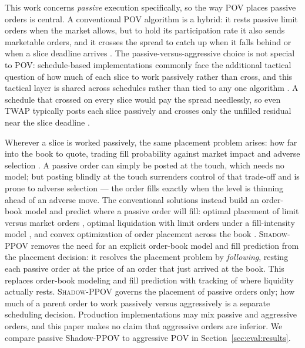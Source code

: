\documentclass[11pt]{article}
\newcommand{\pov}{\textsc{Shadow-PPOV}}
\begin{document}
This work concerns \emph{passive} execution specifically, so the way POV places
passive orders is central. A conventional POV algorithm is a hybrid: it rests
passive limit orders when the market allows, but to hold its participation rate
it also sends marketable orders, and it crosses the spread to catch up when it
falls behind or when a slice deadline arrives \cite{cartea2015,contkukanov2015}.
The passive-versus-aggressive choice is not special to POV: schedule-based
implementations commonly face the additional tactical question of how much of
each slice to work passively rather than
cross, and this tactical layer is shared across schedules rather than tied to any one algorithm \cite{scheduletactics2014,limitmarkettactics2014}. A schedule
that crossed on every slice would pay the spread needlessly, so even TWAP
typically posts each slice passively and crosses only the unfilled residual near
the slice deadline \cite{cesari2012}.

Wherever a slice is worked passively, the same placement problem arises: how far
into the book to quote, trading fill probability against market impact and
adverse selection \cite{glostenmilgrom1985,gueant2012,passiveimpact2026,negdrift2024}. A passive order can
simply be posted at the touch, which needs no model; but posting blindly at the
touch surrenders control of that trade-off and is prone to adverse selection ---
the order fills exactly when the level is thinning ahead of an adverse move.
The conventional solutions instead
build an order-book model and predict where a passive order will fill:
optimal placement of limit versus market orders \cite{cartea2015}, optimal
liquidation with limit orders under a fill-intensity model \cite{gueant2012},
and convex optimization of order placement across the book \cite{contkukanov2015}.
\pov{} removes the need for an explicit order-book model and fill prediction from
the placement decision: it resolves the placement
problem by \emph{following}, resting each passive order at the price of an order
that just arrived at the book. This replaces order-book modeling and fill prediction with
tracking of where liquidity actually rests. \pov{} governs the placement of
passive orders only; how much of a parent order to work passively versus
aggressively is a separate scheduling decision. Production implementations may
mix passive and aggressive orders, and this paper makes no claim that aggressive
orders are inferior. We compare passive Shadow-PPOV to aggressive POV
in Section~\ref{sec:eval:results}.
\end{document}
